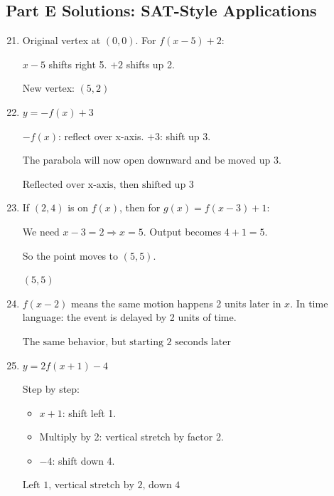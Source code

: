 \documentclass[14pt]{extarticle}
\begin{document}
\subsection*{Part E Solutions: SAT-Style Applications}
\begin{enumerate}
  \setcounter{enumi}{20}
  \item Original vertex at \((0,0)\). For \(f(x - 5) + 2\):

  \(x - 5\) shifts right 5. \(+2\) shifts up 2.

  New vertex: \(\boxed{(5, 2)}\)

  \item \(y = -f(x) + 3\)

  \(-f(x)\): reflect over x-axis.  
  \(+3\): shift up 3.

  The parabola will now open downward and be moved up 3.

  \(\boxed{\text{Reflected over x-axis, then shifted up 3}}\)

  \item If \((2,4)\) is on \(f(x)\), then for \(g(x) = f(x - 3) + 1\):

  We need \(x - 3 = 2 \Rightarrow x = 5.\)  
  Output becomes \(4 + 1 = 5.\)

  So the point moves to \((5,5)\).

  \(\boxed{(5, 5)}\)

  \item \(f(x - 2)\) means the same motion happens 2 units later in \(x\).  
  In time language: the event is delayed by 2 units of time.

  \(\boxed{\text{The same behavior, but starting 2 seconds later}}\)

  \item \(y = 2f(x + 1) - 4\)

  Step by step:
  \begin{itemize}
    \item \(x + 1\): shift left 1.
    \item Multiply by 2: vertical stretch by factor 2.
    \item \(-4\): shift down 4.
  \end{itemize}

  \(\boxed{\text{Left 1, vertical stretch by 2, down 4}}\)
\end{enumerate}





\end{document}
